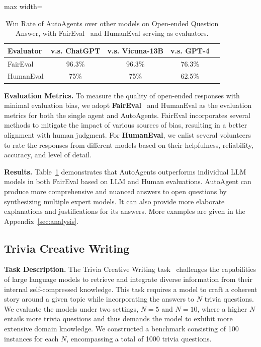 \begin{table}[!htbp]
\caption{Win Rate of AutoAgents over other models on Open-ended Question Answer, with FairEval~\cite{wang2023large} and HumanEval serving as evaluators.}
\label{tab:open}
\centering
\begin{adjustbox}{max width=\linewidth}
\begin{tabular}{lcccc}
\toprule
\textbf{Evaluator} & v.s. \textbf{ChatGPT} & v.s. \textbf{Vicuna-13B} & v.s. \textbf{GPT-4}\\
\midrule
FairEval~\cite{wang2023large} & 96.3\% & 96.3\% & 76.3\% \\
HumanEval & 75\% & 75\% & 62.5\% \\
\bottomrule
\end{tabular}
\end{adjustbox}
\end{table}

\textbf{Evaluation Metrics.} 
To measure the quality of open-ended responses with minimal evaluation bias, we adopt \textbf{FairEval}~\cite{wang2023large} and HumanEval as the evaluation metrics for both the single agent and AutoAgents. FairEval incorporates several methods to mitigate the impact of various sources of bias, resulting in a better alignment with human judgment. For \textbf{HumanEval}, we enlist several volunteers to rate the responses from different models based on their helpfulness, reliability, accuracy, and level of detail. 

\textbf{Results.} 
Table~\ref{tab:open} demonstrates that AutoAgents outperforms individual LLM models in both FairEval based on LLM and Human evaluations. AutoAgent can produce more comprehensive and nuanced answers to open questions by synthesizing multiple expert models. It can also provide more elaborate explanations and justifications for its answers. More examples are given in the Appendix~\ref{sec:analysis}.


\subsection{Trivia Creative Writing}
\label{sec:triva}

\textbf{Task Description.} 
The Trivia Creative Writing task~\cite{wang2023unleashing} challenges the capabilities of large language models to retrieve and integrate diverse information from their internal self-compressed knowledge. This task requires a model to craft a coherent story around a given topic while incorporating the answers to $N$ trivia questions. We evaluate the models under two settings, $N=5$ and $N=10$, where a higher $N$ entails more trivia questions and thus demands the model to exhibit more extensive domain knowledge. We constructed a benchmark consisting of 100 instances for each $N$, encompassing a total of 1000 trivia questions.

